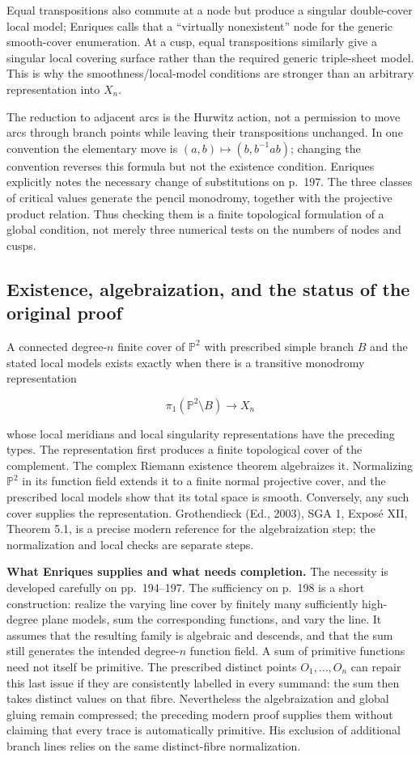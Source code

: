 Equal transpositions also commute at a node but produce a singular double-cover local model; Enriques calls that a ``virtually nonexistent'' node for the generic smooth-cover enumeration. At a cusp, equal transpositions similarly give a singular local covering surface rather than the required generic triple-sheet model. This is why the smoothness/local-model conditions are stronger than an arbitrary representation into \(X_n\).

The reduction to adjacent arcs is the Hurwitz action, not a permission to move arcs through branch points while leaving their transpositions unchanged. In one convention the elementary move is \((a,b)\mapsto(b,b^{-1}ab)\); changing the convention reverses this formula but not the existence condition. Enriques explicitly notes the necessary change of substitutions on p.~197. The three classes of critical values generate the pencil monodromy, together with the projective product relation. Thus checking them is a finite topological formulation of a global condition, not merely three numerical tests on the numbers of nodes and cusps.

\subsection{Existence, algebraization, and the status of the original proof}

A connected degree-\(n\) finite cover of \(\mathbb P^2\) with prescribed simple branch \(B\) and the stated local models exists exactly when there is a transitive monodromy representation

\[
\pi_1(\mathbb P^2\setminus B)\longrightarrow X_n
\]

whose local meridians and local singularity representations have the preceding types. The representation first produces a finite topological cover of the complement. The complex Riemann existence theorem algebraizes it. Normalizing \(\mathbb P^2\) in its function field extends it to a finite normal projective cover, and the prescribed local models show that its total space is smooth. Conversely, any such cover supplies the representation. Grothendieck (Ed., 2003), SGA 1, Exposé XII, Theorem 5.1, is a precise modern reference for the algebraization step; the normalization and local checks are separate steps.

\textbf{What Enriques supplies and what needs completion.} The necessity is developed carefully on pp.~194--197. The sufficiency on p.~198 is a short construction: realize the varying line cover by finitely many sufficiently high-degree plane models, sum the corresponding functions, and vary the line. It assumes that the resulting family is algebraic and descends, and that the sum still generates the intended degree-\(n\) function field. A sum of primitive functions need not itself be primitive. The prescribed distinct points \(O_1,\dots,O_n\) can repair this last issue if they are consistently labelled in every summand: the sum then takes distinct values on that fibre. Nevertheless the algebraization and global gluing remain compressed; the preceding modern proof supplies them without claiming that every trace is automatically primitive. His exclusion of additional branch lines relies on the same distinct-fibre normalization.

